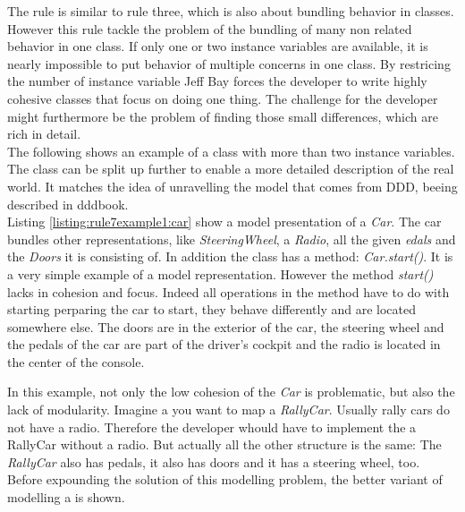The rule is similar to rule three, which is also about bundling behavior in classes. However this rule tackle the problem of the bundling of many non related behavior in one class. If only one or two instance variables are available, it is nearly impossible to put behavior of multiple concerns in one class. By restricing the number of instance variable Jeff Bay forces the developer to write highly cohesive classes that focus on doing one thing. The challenge for the developer might furthermore be the problem of finding those small differences, which are rich in detail. 
\\

The following shows an example of a class with more than two instance variables. The class can be split up further to enable a more detailed description of the real world. It matches the idea of unravelling the model that comes from \ac{DDD}, beeing described in \ac{dddbook}.
\\

Listing \ref{listing:rule7example1:car} show a model presentation of a \textit{Car}. The car bundles other representations, like \textit{SteeringWheel}, a \textit{Radio}, all the given \textit{edals} and the \textit{Doors} it is consisting of. In addition the class has a method: \textit{Car.start()}. It is a very simple example of a model representation. However the method \textit{start()} lacks in cohesion and focus. Indeed all operations in the method have to do with starting perparing the car to start, they behave differently and are located somewhere else. The doors are in the exterior of the car, the steering wheel and the pedals of the car are part of the driver's cockpit and the radio is located in the center of the console.

In this example, not only the low cohesion of the \textit{Car} is problematic, but also the lack of modularity. Imagine a you want to map a \textit{RallyCar}. Usually rally cars do not have a radio. Therefore the developer whould have to implement the a RallyCar without a radio. But actually all the other structure is the same: The \textit{RallyCar} also has pedals, it also has doors and it has a steering wheel, too. Before expounding the solution of this modelling problem, the better variant of modelling a  is shown. 
\\

